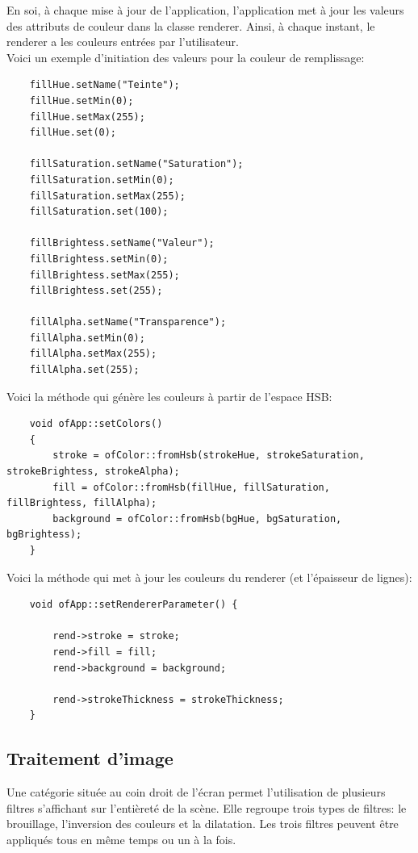  En soi, à chaque mise à jour de l'application, l'application met à jour les valeurs des attributs de couleur dans la classe renderer. Ainsi, à chaque instant, le renderer a les couleurs entrées par l'utilisateur.\\
 
 Voici un exemple d'initiation des valeurs pour la couleur de remplissage:
 \begin{lstlisting}
 	fillHue.setName("Teinte");
 	fillHue.setMin(0);
 	fillHue.setMax(255);
 	fillHue.set(0);
 
 	fillSaturation.setName("Saturation");
 	fillSaturation.setMin(0);
 	fillSaturation.setMax(255);
 	fillSaturation.set(100);
 
 	fillBrightess.setName("Valeur");
 	fillBrightess.setMin(0);
	fillBrightess.setMax(255);
	fillBrightess.set(255);
 
 	fillAlpha.setName("Transparence");
 	fillAlpha.setMin(0);
 	fillAlpha.setMax(255);
 	fillAlpha.set(255);
 \end{lstlisting} 

Voici la méthode qui génère les couleurs à partir de l'espace HSB:
\begin{lstlisting}
	void ofApp::setColors()
	{
		stroke = ofColor::fromHsb(strokeHue, strokeSaturation, strokeBrightess, strokeAlpha);
		fill = ofColor::fromHsb(fillHue, fillSaturation, fillBrightess, fillAlpha);
		background = ofColor::fromHsb(bgHue, bgSaturation, bgBrightess);
	}
\end{lstlisting} 

Voici la méthode qui met à jour les couleurs du renderer (et l'épaisseur de lignes):
\begin{lstlisting}
	void ofApp::setRendererParameter() {
		
		rend->stroke = stroke;
		rend->fill = fill;
		rend->background = background;
		
		rend->strokeThickness = strokeThickness;
	}
\end{lstlisting}


\subsection{Traitement d'image}
Une catégorie située au coin droit de l’écran permet l’utilisation de plusieurs filtres s’affichant sur l’entièreté de la scène. Elle regroupe trois types de filtres: le brouillage, l’inversion des couleurs et la dilatation. Les trois filtres peuvent être appliqués tous en même temps ou un à la fois.\\

